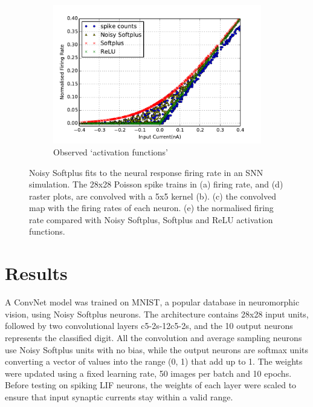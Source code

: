 \begin{figure}[bt!]
\begin{subfigure}[t]{0.4\textwidth}
		    \label{Fig:61}
		\end{subfigure}
		\begin{subfigure}[t]{0.4\textwidth}
			\includegraphics[width=\textwidth]{pics_iconip/6-5.pdf}
		    \caption{Observed `activation functions'}
		    \label{Fig:65}
		\end{subfigure}
		\caption{
			Noisy Softplus fits to the neural response firing rate in an SNN simulation.
			The 28x28 Poisson spike trains in (a) firing rate, and (d) raster plots, are convolved with a 5x5 kernel (b).
			(c) the convolved map with the firing rates of each neuron.
			(e) the normalised firing rate compared with Noisy Softplus, Softplus and ReLU activation functions.}
		\label{fig:cnn}
	\end{figure}
\section{Results}
	A ConvNet model was trained on MNIST,
	a popular database in neuromorphic vision, using Noisy Softplus neurons.
	The architecture contains 28x28 input units, followed by two convolutional layers c5-2s-12c5-2s, and the 10 output neurons represents the classified digit.
	All the convolution and average sampling neurons use Noisy Softplus units with no bias, while the output neurons are softmax units converting a vector of values into the range (0, 1) that add up to 1.
	The weights were updated using a fixed learning rate, 50 images per batch and 10 epochs.
	Before testing on spiking LIF neurons, the weights of each layer were scaled to ensure that input synaptic currents stay within a valid range.
	
